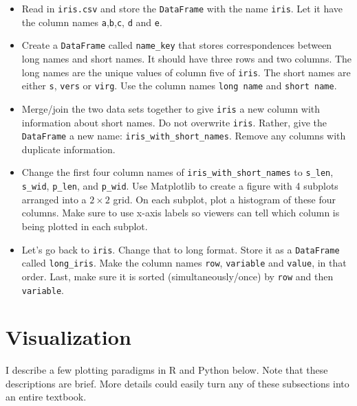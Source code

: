 \documentclass[
  12pt,
  krantz2]{krantz}
\providecommand{\tightlist}{%
  \setlength{\itemsep}{0pt}\setlength{\parskip}{0pt}}
\begin{document}
\begin{itemize}
\tightlist
\item
  Read in \texttt{iris.csv} and store the \texttt{DataFrame} with the name \texttt{iris}. Let it have the column names \texttt{\textquotesingle{}a\textquotesingle{}},\texttt{\textquotesingle{}b\textquotesingle{}},\texttt{\textquotesingle{}c\textquotesingle{}}, \texttt{\textquotesingle{}d\textquotesingle{}} and \texttt{\textquotesingle{}e\textquotesingle{}}.
\item
  Create a \texttt{DataFrame} called \texttt{name\_key} that stores correspondences between long names and short names. It should have three rows and two columns. The long names are the unique values of column five of \texttt{iris}. The short names are either \texttt{\textquotesingle{}s\textquotesingle{}}, \texttt{\textquotesingle{}vers\textquotesingle{}} or \texttt{\textquotesingle{}virg\textquotesingle{}}. Use the column names \texttt{\textquotesingle{}long\ name\textquotesingle{}} and \texttt{\textquotesingle{}short\ name\textquotesingle{}}.
\item
  Merge/join the two data sets together to give \texttt{iris} a new column with information about short names. Do not overwrite \texttt{iris}. Rather, give the \texttt{DataFrame} a new name: \texttt{iris\_with\_short\_names}. Remove any columns with duplicate information.
\item
  Change the first four column names of \texttt{iris\_with\_short\_names} to \texttt{s\_len}, \texttt{s\_wid}, \texttt{p\_len}, and \texttt{p\_wid}. Use Matplotlib to create a figure with 4 subplots arranged into a \(2 \times 2\) grid. On each subplot, plot a histogram of these four columns. Make sure to use x-axis labels so viewers can tell which column is being plotted in each subplot.
\item
  Let's go back to \texttt{iris}. Change that to long format. Store it as a \texttt{DataFrame} called \texttt{long\_iris}. Make the column names \texttt{row}, \texttt{variable} and \texttt{value}, in that order. Last, make sure it is sorted (simultaneously/once) by \texttt{row} and then \texttt{variable}.
\end{itemize}

\hypertarget{visualization}{%
\chapter{Visualization}\label{visualization}}

I describe a few plotting paradigms in R and Python below. Note that these descriptions are brief. More details could easily turn any of these subsections into an entire textbook.
\end{document}
